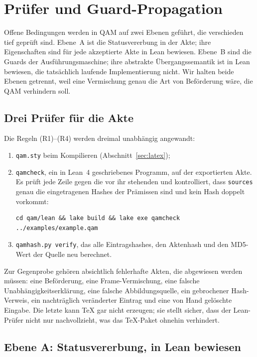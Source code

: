 \section{Prüfer und Guard-Propagation}\label{sec:guards}

Offene Bedingungen werden in QAM auf zwei Ebenen geführt, die verschieden tief geprüft sind. Ebene~A ist die Statusvererbung in der Akte;
ihre Eigenschaften sind für jede akzeptierte Akte in Lean bewiesen. Ebene~B sind die Guards der Ausführungsmaschine; ihre abstrakte
Übergangssemantik ist in Lean bewiesen, die tatsächlich laufende Implementierung nicht. Wir halten beide Ebenen getrennt, weil eine
Vermischung genau die Art von Beförderung wäre, die QAM verhindern soll.

\subsection{Drei Prüfer für die Akte}\label{sec:pruefer}

Die Regeln (R1)--(R4) werden dreimal unabhängig angewandt:
\begin{enumerate}[nosep]
\item \texttt{qam.sty} beim Kompilieren (Abschnitt~\ref{sec:latex});
\item \texttt{qamcheck}, ein in Lean~4 geschriebenes Programm, auf der exportierten Akte. Es prüft jede Zeile gegen die vor ihr stehenden
und kontrolliert, dass \texttt{sources} genau die eingetragenen Hashes der Prämissen sind und kein Hash doppelt vorkommt:
\begin{lstlisting}
cd qam/lean && lake build && lake exe qamcheck ../examples/example.qam
\end{lstlisting}
\item \texttt{qamhash.py verify}, das alle Eintragshashes, den Aktenhash und den MD5-Wert der Quelle neu berechnet.
\end{enumerate}
Zur Gegenprobe gehören absichtlich fehlerhafte Akten, die abgewiesen werden müssen: eine Beförderung, eine Frame-Vermischung, eine falsche
Unabhängigkeitserklärung, eine falsche Abbildungsquelle, ein gebrochener Hash-Verweis, ein nachträglich veränderter Eintrag und eine von Hand
gelöschte Eingabe. Die letzte kann \TeX{} gar nicht erzeugen; sie stellt sicher, dass der Lean-Prüfer nicht nur nachvollzieht, was das
\TeX-Paket ohnehin verhindert.

\subsection{Ebene A: Statusvererbung, in Lean bewiesen}\label{sec:ebeneA}

